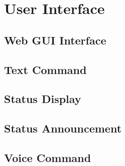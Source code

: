 \chapter{User Interface}

\section{Web GUI Interface}

\section{Text Command}

\section{Status Display}

\section{Status Announcement}

\section{Voice Command}

